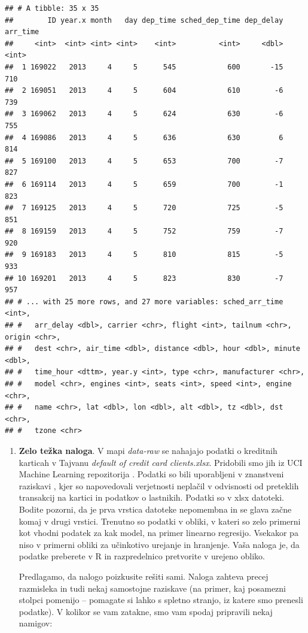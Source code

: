 \documentclass[
]{book}
\begin{document}
\begin{itemize}
\begin{verbatim}
## # A tibble: 35 x 35
##        ID year.x month   day dep_time sched_dep_time dep_delay arr_time
##     <int>  <int> <int> <int>    <int>          <int>     <dbl>    <int>
##  1 169022   2013     4     5      545            600       -15      710
##  2 169051   2013     4     5      604            610        -6      739
##  3 169062   2013     4     5      624            630        -6      755
##  4 169086   2013     4     5      636            630         6      814
##  5 169100   2013     4     5      653            700        -7      827
##  6 169114   2013     4     5      659            700        -1      823
##  7 169125   2013     4     5      720            725        -5      851
##  8 169159   2013     4     5      752            759        -7      920
##  9 169183   2013     4     5      810            815        -5      933
## 10 169201   2013     4     5      823            830        -7      957
## # ... with 25 more rows, and 27 more variables: sched_arr_time <int>,
## #   arr_delay <dbl>, carrier <chr>, flight <int>, tailnum <chr>, origin <chr>,
## #   dest <chr>, air_time <dbl>, distance <dbl>, hour <dbl>, minute <dbl>,
## #   time_hour <dttm>, year.y <int>, type <chr>, manufacturer <chr>,
## #   model <chr>, engines <int>, seats <int>, speed <int>, engine <chr>,
## #   name <chr>, lat <dbl>, lon <dbl>, alt <dbl>, tz <dbl>, dst <chr>,
## #   tzone <chr>
\end{verbatim}
\end{itemize}

\begin{enumerate}
\def\labelenumi{\arabic{enumi})}
\setcounter{enumi}{4}
\item
  \textbf{Zelo težka naloga}. V mapi \emph{data-raw} se nahajajo podatki o kreditnih karticah v Tajvanu \emph{default of credit card clients.xlsx}. Pridobili smo jih iz UCI Machine Learning repozitorija \citep{Dua2019}. Podatki so bili uporabljeni v znanstveni raziskavi \citep{Yeh2009}, kjer so napovedovali verjetnosti neplačil v odvisnosti od preteklih transakcij na kartici in podatkov o lastnikih. Podatki so v xlsx datoteki. Bodite pozorni, da je prva vrstica datoteke nepomembna in se glava začne komaj v drugi vrstici. Trenutno so podatki v obliki, v kateri so zelo primerni kot vhodni podatek za kak model, na primer linearno regresijo. Vsekakor pa niso v primerni obliki za učinkotivo urejanje in hranjenje. Vaša naloga je, da podatke preberete v R in razpredelnico pretvorite v urejeno obliko.

  Predlagamo, da nalogo poizkusite rešiti sami. Naloga zahteva precej razmisleka in tudi nekaj samostojne raziskave (na primer, kaj posamezni stolpci pomenijo -- pomagate si lahko s spletno stranjo, iz katere smo prenesli podatke). V kolikor se vam zatakne, smo vam spodaj pripravili nekaj namigov:
\end{enumerate}
\end{document}
